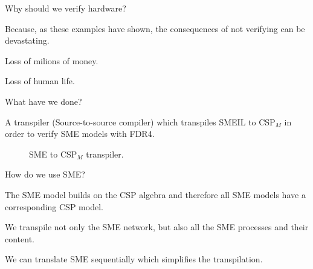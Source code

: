 \documentclass[13pt]{beamer}
\newcommand{\cspm}{CSP$_M$}
\begin{document}
\begin{frame}{Why should we verify hardware?}
    \begin{block}{}
        Because, as these examples have shown, the consequences of not verifying can be devastating.
            \vspace{5mm}

        Loss of milions of money.
            \vspace{5mm}

        Loss of human life.
    \end{block}
\end{frame}
%
\begin{frame}{What have we done?}
 \begin{block}{}
   A transpiler (Source-to-source compiler) which transpiles SMEIL to \cspm{} in order to verify SME models with FDR4.
 \begin{figure}[!ht]
  \centering
  \caption{SME to \cspm{} transpiler.}
  \label{fig:sme-to-cspm}
\end{figure}
 \end{block}
\end{frame}
%
\begin{frame}{How do we use SME?}
 \begin{block}{}
   The SME model builds on the CSP algebra and therefore all SME models have a corresponding CSP model.

 \end{block}

 \pause

  \begin{block}{}
    We transpile not only the SME network, but also all the SME processes and their content.
  \end{block}

 \pause

  \begin{block}{}
    We can translate SME sequentially which simplifies the transpilation.
  \end{block}
\end{frame}
\end{document}
